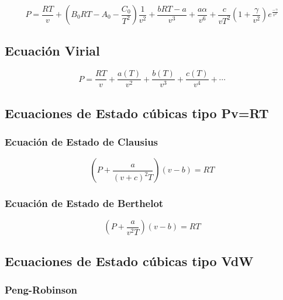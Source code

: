     \begin{equation}
    \label{virial_1}
        P=\frac{RT}{v} + \left ( B_{0}RT-A_{0}-\frac{C_{0}}{T^{2}}\right )\frac{1}{v^{2}} + \frac{bRT-a}{v^{3}} + \frac{a \alpha}{v^{6}} + \frac{c}{vT^{2}}\left ( 1 + \frac{\gamma}{v^{2}} \right ) e^{\frac{-\gamma}{v^{2}}}
    \end{equation}
    
    \subsection{Ecuación Virial}
    
    \begin{equation}
        P=\frac{RT}{v} + \frac{a(T)}{v^{2}} + \frac{b(T)}{v^{3}} + \frac{c(T)}{v^{4}} + \cdots
    \end{equation}
    
    \subsection{Ecuaciones de Estado cúbicas tipo Pv=RT}
    
        \subsubsection{Ecuación de Estado de Clausius}
        
        \begin{equation}
            \left ( P + \frac{a}{(v+c)^{2}T} \right )(v-b)=RT
        \end{equation}
        
        \subsubsection{Ecuación de Estado de Berthelot}
        
        \begin{equation}
            \left ( P + \frac{a}{v^{2}T} \right )(v-b)=RT
        \end{equation}
        
    \subsection{Ecuaciones de Estado cúbicas tipo VdW}
        
        \subsubsection{Peng-Robinson}
        
